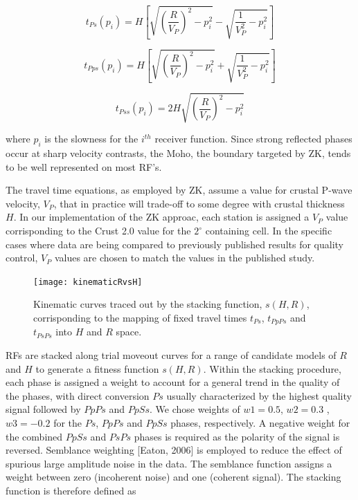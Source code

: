 \documentclass[draft, 12pt]{article}
\begin{document}
\begin{equation} \label{eq:tps}
t_{Ps}(p_i)=H \left[ \sqrt{ \left(\frac{R}{V_P}\right)^2 - p_i^2} - \sqrt{\frac{1}{V_P^2} - p_i^2} \right]
\end{equation}

\begin{equation}
t_{Pps}(p_i)=H \left[ \sqrt{ \left(\frac{R}{V_P}\right)^2 - p_i^2} + \sqrt{\frac{1}{V_P^2} - p_i^2} \right]
\end{equation}

\begin{equation}
t_{Pss}(p_i)= 2H  \sqrt{ \left(\frac{R}{V_P}\right)^2 - p_i^2}
\end{equation}

where $p_i$ is the slowness for the $i^{th}$ receiver function. Since strong reflected phases occur at sharp velocity contrasts, the Moho, the boundary targeted by ZK, tends to be well represented on most RF's.

The travel time equations, as employed by ZK, assume a value for crustal P-wave velocity, $V_P$, that
in practice will trade-off to some degree with crustal thickness $H$. In our implementation of the ZK approac, each station is assigned a $V_P$ value corrisponding to the Crust 2.0 value for the $2^\circ$ containing cell. In the specific cases where data are being compared to previously published results for quality control, $V_P$  values are chosen to match the values in the published study.

\begin{figure}
  \centering
    \texttt{[image: kinematicRvsH]}
  \caption{Kinematic curves traced out by the stacking function, $s(H,R)$, corrisponding to the mapping of fixed travel times $t_{Ps}$, $t_{PpPs}$ and $t_{PsPs}$ into $H$ and $R$ space.}
  \label{fig:kinematicRvsH}
\end{figure}

RFs are stacked along trial moveout curves for a range of candidate models of $R$ and $H$ to generate a fitness function $s(H,R)$.  Within the stacking procedure, each phase is assigned a weight to account for a general trend in the quality of the phases, with direct conversion $Ps$ usually characterized by the highest quality signal followed by $PpPs$ and $PpSs$. We chose weights of $w1 = 0.5$, $w2 = 0.3$ , $w3 = -0.2$ for the $Ps$, $PpPs$ and $PpSs$ phases, respectively. A negative weight for the combined $PpSs$ and $PsPs$ phases is required as the polarity of the signal is reversed. Semblance weighting [Eaton, 2006] is employed to reduce the effect of spurious large amplitude noise in the data. The semblance function assigns a weight between zero (incoherent noise) and one (coherent signal). The stacking function is therefore defined as
\end{document}
